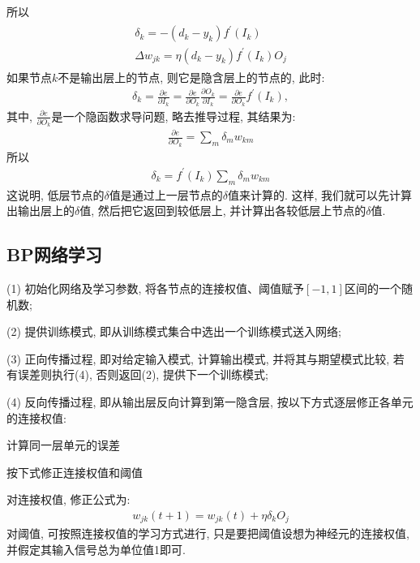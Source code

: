 所以
\begin{align*}
  \begin{array}{l}{\delta_{k}=-\left(d_{k}-y_{k}\right) f^{\prime}\left(I_{k}\right)} \\
  {\Delta w_{j k}=\eta\left(d_{k}-y_{k}\right) f^{\prime}\left(I_{k}\right) O_{j}}
  \end{array}
\end{align*}
如果节点$k$不是输出层上的节点, 则它是隐含层上的节点的, 此时:
\begin{align*}
  \delta_{k}=\frac{\partial e}{\partial I_{k}}=\frac{\partial e}{\partial O_{k}} \frac{\partial O_{k}}{\partial I_{k}}=\frac{\partial e}{\partial O_{k}} f^{\prime}\left(I_{k}\right),
\end{align*}
其中, $\frac{\partial e}{\partial O_{k}}$是一个隐函数求导问题, 略去推导过程, 其结果为:
\begin{align*}
  \frac{\partial e}{\partial O_{k}}=\sum_{m} \delta_{m} w_{k m}
\end{align*}
所以
\begin{align*}
  \delta_{k}=f^{\prime}\left(I_{k}\right) \sum_{m} \delta_{m} w_{k m}
\end{align*}
这说明, 低层节点的$\delta$值是通过上一层节点的$\delta$值来计算的. 这样, 我们就可以先计算出输出层上的$\delta$值, 然后把它返回到较低层上, 并计算出各较低层上节点的$\delta$值.
\subsection{BP网络学习}

(1) 初始化网络及学习参数, 将各节点的连接权值、阈值赋予$[-1, 1]$区间的一个随机数;

(2) 提供训练模式, 即从训练模式集合中选出一个训练模式送入网络;

(3) 正向传播过程, 即对给定输入模式, 计算输出模式, 并将其与期望模式比较, 若有误差则执行(4), 否则返回(2), 提供下一个训练模式;

(4) 反向传播过程, 即从输出层反向计算到第一隐含层, 按以下方式逐层修正各单元的连接权值:

    \quad {} 计算同一层单元的误差

    \quad {} 按下式修正连接权值和阈值

    \quad 对连接权值, 修正公式为:
        \begin{align}
          w_{j k}(t+1)=w_{j k}(t)+\eta \delta_{k} O_{j}
        \end{align}
    对阈值, 可按照连接权值的学习方式进行, 只是要把阈值设想为神经元的连接权值, 并假定其输入信号总为单位值1即可.

